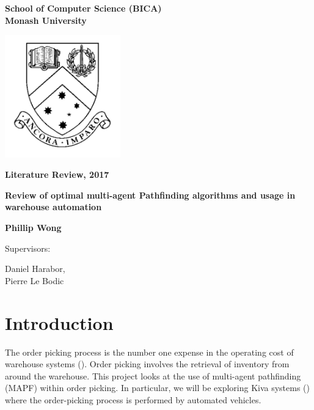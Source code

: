 \documentclass[a4paper,11pt]{article}
\begin{document}
	
\thispagestyle{empty} %
\renewcommand{\thepage}{\roman{page}}

\begin{spacing}{1.5}
	\begin{center}
		{\Large \bfseries
			School of Computer Science (BICA) \\
			Monash University}
		
		
		\vspace*{30mm}
		
		\includegraphics[width=5cm]{graphics/MonashCrest.pdf}
		
		\vspace*{15mm}
		
		{\large \bfseries
			Literature Review, 2017
		}
		
		\vspace*{10mm}
		
		{\LARGE \bfseries
			Review of optimal multi-agent Pathfinding algorithms and usage in warehouse automation
		}
		
		\vspace*{20mm}
		
		{\large \bfseries
			Phillip Wong
			
			\vspace*{20mm}
			
			
			Supervisors: \parbox[t]{50mm}{Daniel Harabor,\\Pierre Le Bodic}
		}
		
	\end{center}
\end{spacing}

\newpage

\tableofcontents

\newpage
\setcounter{page}{1}
\renewcommand{\thepage}{\arabic{page}}

\section{Introduction} \label{sec:introduction}
The order picking process is the number one expense in the operating cost of warehouse systems (\cite{de2007design}). Order picking involves the retrieval of inventory from around the warehouse.
This project looks at the use of multi-agent pathfinding (MAPF) within order picking. In particular, we will be exploring Kiva systems (\cite{wurman2008coordinating}) where the order-picking process is performed by automated vehicles. 
\end{document}
